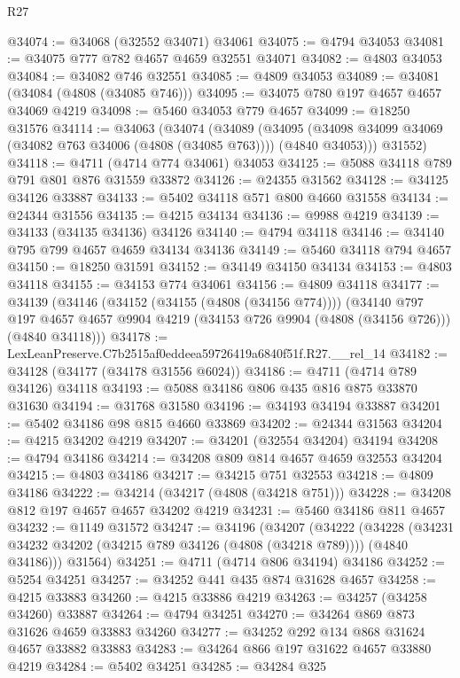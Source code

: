 \begin{lexlean}{R27}
\begin{coremodule}
@34074 := @34068 (@32552 @34071) @34061
@34075 := @4794 @34053
@34081 := @34075 @777 @782 @4657 @4659 @32551 @34071
@34082 := @4803 @34053
@34084 := @34082 @746 @32551
@34085 := @4809 @34053
@34089 := @34081 (@34084 (@4808 (@34085 @746)))
@34095 := @34075 @780 @197 @4657 @4657 @34069 @4219
@34098 := @5460 @34053 @779 @4657
@34099 := @18250 @31576
@34114 := @34063
    (@34074
      (@34089
        (@34095 (@34098 @34099 @34069 (@34082 @763 @34006 (@4808 (@34085 @763)))) (@4840 @34053)))
      @31552)
@34118 := @4711 (@4714 @774 @34061) @34053
@34125 := @5088 @34118 @789 @791 @801 @876 @31559 @33872
@34126 := @24355 @31562
@34128 := @34125 @34126 @33887
@34133 := @5402 @34118 @571 @800 @4660 @31558
@34134 := @24344 @31556
@34135 := @4215 @34134
@34136 := @9988 @4219
@34139 := @34133 (@34135 @34136) @34126
@34140 := @4794 @34118
@34146 := @34140 @795 @799 @4657 @4659 @34134 @34136
@34149 := @5460 @34118 @794 @4657
@34150 := @18250 @31591
@34152 := @34149 @34150 @34134
@34153 := @4803 @34118
@34155 := @34153 @774 @34061
@34156 := @4809 @34118
@34177 := @34139
    (@34146
      (@34152 (@34155 (@4808 (@34156 @774))))
      (@34140
        @797
        @197
        @4657
        @4657
        @9904
        @4219
        (@34153 @726 @9904 (@4808 (@34156 @726)))
        (@4840 @34118)))
@34178 := LexLeanPreserve.C7b2515af0eddeea59726419a6840f51f.R27.__rel_14
@34182 := @34128 (@34177 (@34178 @31556 @6024))
@34186 := @4711 (@4714 @789 @34126) @34118
@34193 := @5088 @34186 @806 @435 @816 @875 @33870 @31630
@34194 := @31768 @31580
@34196 := @34193 @34194 @33887
@34201 := @5402 @34186 @98 @815 @4660 @33869
@34202 := @24344 @31563
@34204 := @4215 @34202 @4219
@34207 := @34201 (@32554 @34204) @34194
@34208 := @4794 @34186
@34214 := @34208 @809 @814 @4657 @4659 @32553 @34204
@34215 := @4803 @34186
@34217 := @34215 @751 @32553
@34218 := @4809 @34186
@34222 := @34214 (@34217 (@4808 (@34218 @751)))
@34228 := @34208 @812 @197 @4657 @4657 @34202 @4219
@34231 := @5460 @34186 @811 @4657
@34232 := @1149 @31572
@34247 := @34196
    (@34207
      (@34222
        (@34228 (@34231 @34232 @34202 (@34215 @789 @34126 (@4808 (@34218 @789)))) (@4840 @34186)))
      @31564)
@34251 := @4711 (@4714 @806 @34194) @34186
@34252 := @5254 @34251
@34257 := @34252 @441 @435 @874 @31628 @4657
@34258 := @4215 @33883
@34260 := @4215 @33886 @4219
@34263 := @34257 (@34258 @34260) @33887
@34264 := @4794 @34251
@34270 := @34264 @869 @873 @31626 @4659 @33883 @34260
@34277 := @34252 @292 @134 @868 @31624 @4657 @33882 @33883
@34283 := @34264 @866 @197 @31622 @4657 @33880 @4219
@34284 := @5402 @34251
@34285 := @34284 @325

\end{coremodule}
\end{lexlean}
